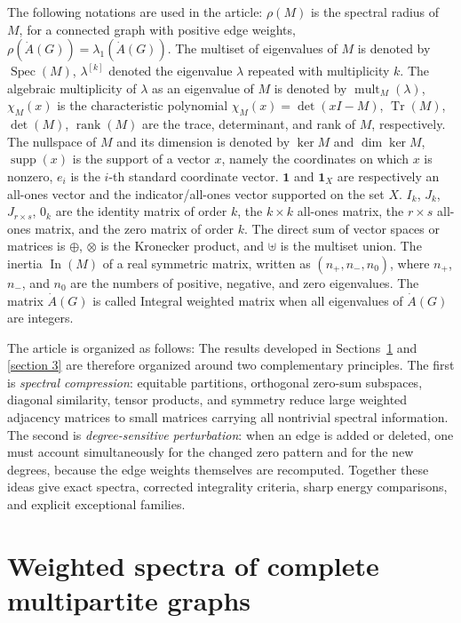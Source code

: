\documentclass[12pt,twoside]{article}
\newcommand{\spec}{\operatorname{Spec}}
\begin{document}
	The following notations are used in the article: $\rho(M)$ is the spectral radius of $M$, for a connected graph with positive edge weights, $\rho(\dot A(G))=\lambda_1(\dot A(G))$. The multiset of eigenvalues of $M$ is denoted by $\spec(M)$, $\lambda^{[k]}$ denoted the eigenvalue $\lambda$ repeated with multiplicity $k$. The algebraic multiplicity of $\lambda$ as an eigenvalue of $M$ is denoted by $\operatorname{mult}_{M}(\lambda)$, $\chi_M(x)$ is the characteristic polynomial
	$
	\chi_M(x)=\det(xI-M)
	$, $\operatorname{Tr}(M)$, $\det(M)$, $\operatorname{rank}(M)$ are the trace, determinant, and rank of $M$, respectively.
	The nullspace of $M$ and its dimension is denoted by $\ker M$ and $\dim\ker M$,  $\operatorname{supp}(x)$ is the support of a vector $x$, namely the coordinates on which $x$ is nonzero, $e_i$ is the $i$-th standard coordinate vector. $\mathbf 1$ and $\mathbf 1_X$ are respectively an all-ones vector and the indicator/all-ones vector supported on the set $X$. $I_k$, $J_k$, $J_{r\times s}$, $0_k$ are the identity matrix of order $k$, the $k\times k$ all-ones matrix, the $r\times s$ all-ones matrix, and the zero matrix of order $k$. The direct sum of vector spaces or matrices is $\oplus$,  $\otimes$ is the Kronecker product, and  $\uplus$ is the multiset union. The inertia $\operatorname{In}(M)$ of a real symmetric matrix, written as $(n_+,n_-,n_0)$, where $n_+$, $n_-$, and $n_0$ are the numbers of positive, negative, and zero eigenvalues. The matrix $\dot A(G)$ is called Integral weighted matrix when all eigenvalues of $\dot A(G)$ are integers.
	
	 
 
The article is organized as follows: The results developed in Sections~\ref{section 2} and \ref{section 3} are therefore organized around two complementary principles. The first is \emph{spectral compression}: equitable partitions, orthogonal zero-sum subspaces, diagonal similarity, tensor products, and symmetry reduce large weighted adjacency matrices to small matrices carrying all nontrivial spectral information. The second is \emph{degree-sensitive perturbation}: when an edge is added or deleted, one must account simultaneously for the changed zero pattern and for the new degrees, because the edge weights themselves are recomputed. Together these ideas give exact spectra, corrected integrality criteria, sharp energy comparisons, and explicit exceptional families.


\section{Weighted spectra of complete multipartite graphs}\label{section 2}
\end{document}
